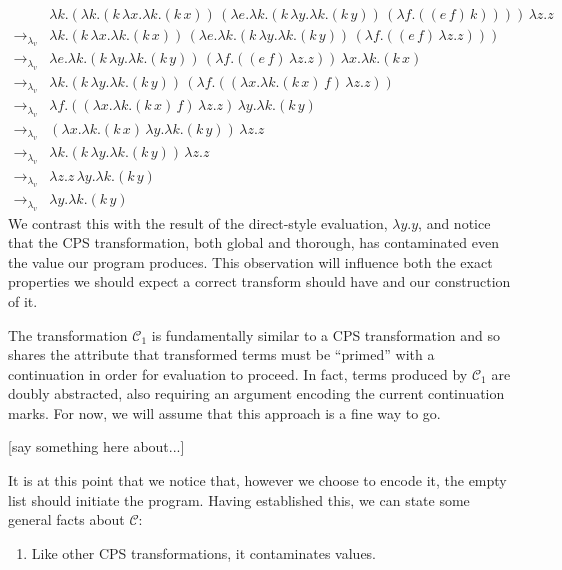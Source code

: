 \documentclass[ms,electronic,twosidetoc,letterpaper,chaptercenter,parttop]{byumsphd}
\begin{document}
\begin{align*}
            &\lambda k.(\lambda k.(k\,\lambda x.\lambda k.(k\,x))\,(\lambda e.\lambda k.(k\,\lambda y.\lambda k.(k\,y))\,(\lambda f.((e\,f)\,k))))\,\lambda z.z\\
\rightarrow_{\lambda_{v}} &\lambda k.(k\,\lambda x.\lambda k.(k\,x))\,(\lambda e.\lambda k.(k\,\lambda y.\lambda k.(k\,y))\,(\lambda f.((e\,f)\,\lambda z.z)))\\
\rightarrow_{\lambda_{v}} &\lambda e.\lambda k.(k\,\lambda y.\lambda k.(k\,y))\,(\lambda f.((e\,f)\,\lambda z.z))\,\lambda x.\lambda k.(k\,x)\\
\rightarrow_{\lambda_{v}} &\lambda k.(k\,\lambda y.\lambda k.(k\,y))\,(\lambda f.((\lambda x.\lambda k.(k\,x)\,f)\,\lambda z.z))\\
\rightarrow_{\lambda_{v}} &\lambda f.((\lambda x.\lambda k.(k\,x)\,f)\,\lambda z.z)\,\lambda y.\lambda k.(k\,y)\\
\rightarrow_{\lambda_{v}} &(\lambda x.\lambda k.(k\,x)\,\lambda y.\lambda k.(k\,y))\,\lambda z.z\\
\rightarrow_{\lambda_{v}} &\lambda k.(k\,\lambda y.\lambda k.(k\,y))\,\lambda z.z\\
\rightarrow_{\lambda_{v}} &\lambda z.z\,\lambda y.\lambda k.(k\,y)\\
\rightarrow_{\lambda_{v}} &\lambda y.\lambda k.(k\,y)
\end{align*}
We contrast this with the result of the direct-style evaluation, $\lambda y.y$, and notice 
that the CPS transformation, both global and thorough, has contaminated even the value our 
program produces. This observation will influence both the exact properties we should 
expect a correct transform should have and our construction of it.


The transformation $\mathcal{C}_{1}$ is fundamentally similar to a CPS transformation and 
so shares the attribute that transformed terms must be ``primed'' with a continuation in 
order for evaluation to proceed. In fact, terms produced by $\mathcal{C}_{1}$ are doubly 
abstracted, also requiring an argument encoding the current continuation marks. For now, 
we will assume that this approach is a fine way to go.

[say something here about...]

It is at this point that we notice that, however we choose to encode it, the empty list 
should initiate the program. Having established this, we can state some general facts about 
$\mathcal{C}$:

\begin{enumerate}
\item Like other CPS transformations, it contaminates values.
\end{enumerate}
\end{document}

